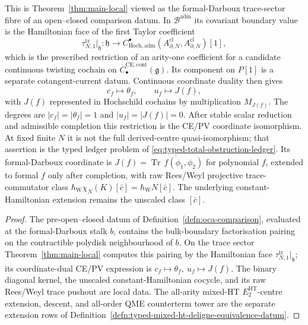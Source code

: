 \begin{thm}
\label{thm:oca-formal-darboux-fibre}

This is Theorem~\ref{thm:main-local} viewed as the formal-Darboux
trace-sector fibre of an open--closed comparison datum.  In
\(\mathcal B^{\mathrm{adm}}\) its covariant boundary value is the
Hamiltonian face of the first Taylor coefficient
\[
  \tau_{N,1}^{\mathrm{tr}}\big|_{\mathfrak h}\colon
  \mathfrak h\longrightarrow
  C^\bullet_{\mathrm{Hoch},\mathrm{adm}}\!
    (A^{\mathrm{cl}}_{\partial,N},A^{\mathrm{cl}}_{\partial,N})[1],
\]
which is the prescribed restriction of an arity-one coefficient for a
candidate continuous twisting cochain on
\(\overline C^{\mathrm{CE},\mathrm{cont}}_\bullet(\mathfrak g)\).
Its component on \(P[1]\) is a separate cotangent-current datum.
Continuous coordinate duality then gives
\[
  c_f\longmapsto\theta_f,\qquad
  u_f\longmapsto J(f),
\]
with \(J(f)\) represented in Hochschild cochains by multiplication
\(M_{J(f)}\).
The degrees are \(|c_f|=|\theta_f|=1\) and \(|u_f|=|J(f)|=0\).
After stable scalar reduction and admissible completion this
	  restriction is the CE/PV coordinate isomorphism.  At fixed finite \(N\) it is not
		the full derived-centre quasi-isomorphism; that assertion is the typed
	ledger problem of \eqref{eq:typed-total-obstruction-ledger}.  Its
	formal-Darboux coordinate
	is \(J(f)=\overline{\operatorname{Tr}\,f(\phi_1,\phi_2)}\) for
polynomial \(f\), extended to formal \(f\) only after completion, with
raw Rees/Weyl projective trace-commutator class
\(\hbar_{\mathrm{W}}\chi_N(K)[\bar c]
=\hbar_{\mathrm{W}}N[\bar c]\).  The underlying
constant-Hamiltonian extension remains the unscaled class \([\bar c]\).
\end{thm}

\begin{proof}
The pre-open--closed datum of Definition~\ref{defn:oca-comparison}, evaluated
at the formal-Darboux stalk \(b\), contains the bulk-boundary factorisation
pairing on the contractible polydisk neighbourhood of \(b\).  On the
trace sector Theorem~\ref{thm:main-local} computes this pairing by the
Hamiltonian face
\(\tau_{N,1}^{\mathrm{tr}}|_{\mathfrak h}\); its
coordinate-dual CE/PV expression is
\(c_f\mapsto\theta_f,\ u_f\mapsto J(f)\).  The binary diagonal kernel,
the unscaled constant-Hamiltonian cocycle, and its raw Rees/Weyl trace
pushout are local data.  The all-arity
mixed-HT \(E_2^{\mathrm{HT}}\)-centre extension, descent, and all-order
QME counterterm tower are the separate extension rows of
Definition~\ref{defn:typed-mixed-ht-deligne-equivalence-datum}.
\end{proof}

